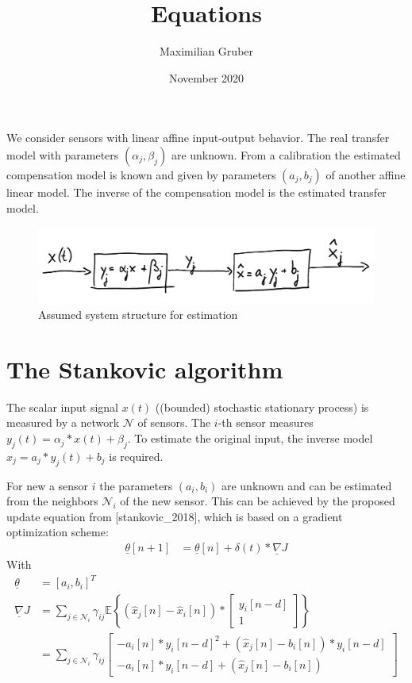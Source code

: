 \documentclass[10pt,a4paper,onecolumn]{article}
\title{Equations}
\author{Maximilian Gruber}    %
\date{November 2020}
\renewcommand{\vec}[1]{\underline{#1}}
\begin{document}
    \maketitle
    We consider sensors with linear affine input-output behavior. The real transfer model with parameters $(\alpha_j, \beta_j)$ are unknown. From a calibration the estimated compensation model is known and given by parameters $(a_j, b_j)$ of another affine linear model. The inverse of the compensation model is the estimated transfer model. 
    \begin{figure}[h]
        \centering
        \includegraphics[width=0.9\linewidth]{system_description.png}
        \caption{Assumed system structure for estimation}
        \label{fig:filterbank}
    \end{figure}
    
    \section{The Stankovic algorithm}
    The scalar input signal $x(t)$ ((bounded) stochastic stationary process) is measured by a network $\mathcal{N}$ of sensors. The $i$-th sensor measures $y_j(t) = \alpha_j * x(t) + \beta_j$. To estimate the original input, the inverse model $\hat{x}_j = a_j * y_j(t) + b_j$ is required. 
    
    For new a sensor $i$ the parameters $(a_i, b_i)$ are unknown and can be estimated from the neighbors $\mathcal{N}_i$ of the new sensor. This can be achieved by the proposed update equation from [stankovic\_2018], which is based on a gradient optimization scheme:
    \begin{align}
        \vec{\theta}[n+1] &= \vec{\theta}[n] + \delta(t) * \vec{\nabla} J
    \end{align}
    With
    \begin{align}
        \vec{\theta} &= [ a_i, b_i ]^T \\
        \vec{\nabla} J &=  \sum_{j \in \mathcal{N}_i} \gamma_{ij} \mathbb{E}\left\{ ( \hat{x}_j[n] - \hat{x}_i[n]) *
            \begin{bmatrix} y_i[n-d] \\ 1 \end{bmatrix} \right\} \nonumber \\
        &= \sum_{j \in \mathcal{N}_i} \gamma_{ij} \begin{bmatrix} - a_i[n]*{y_i[n-d]}^2 + (\hat{x}_j[n] - b_i[n]) * y_i[n-d]\\ - a_i[n]*y_i[n-d] + (\hat{x}_j[n] - b_i[n]) \end{bmatrix}
    \end{align}
    
\end{document}
